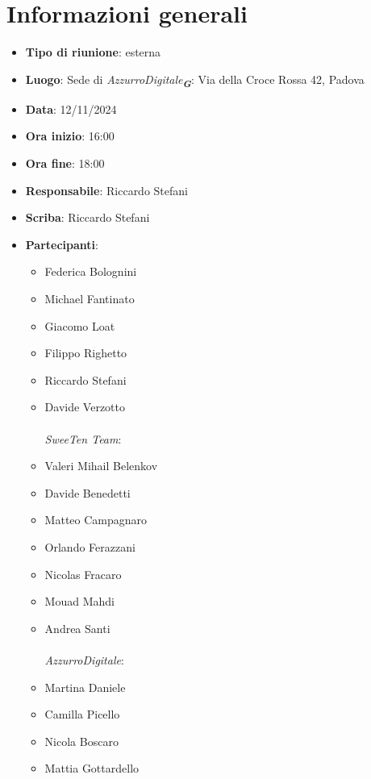 


\section{Informazioni generali}

\begin{itemize}
    \item \textbf{Tipo di riunione}: esterna
    \item \textbf{Luogo}: Sede di \emph{AzzurroDigitale}\textsubscript{\textit{\textbf{G}}}: Via della Croce Rossa 42, Padova
    \item \textbf{Data}: 12/11/2024
    \item \textbf{Ora inizio}: 16:00
    \item \textbf{Ora fine}: 18:00
    \item \textbf{Responsabile}: Riccardo Stefani
    \item \textbf{Scriba}: Riccardo Stefani
    \item \textbf{Partecipanti}:
    \begin{itemize}
        \item Federica Bolognini
        \item Michael Fantinato
        \item Giacomo Loat
        \item Filippo Righetto
        \item Riccardo Stefani
        \item Davide Verzotto \\ \\
        \emph{SweeTen Team}:
        \item Valeri Mihail Belenkov
        \item Davide Benedetti
        \item Matteo Campagnaro
        \item Orlando Ferazzani
        \item Nicolas Fracaro
        \item Mouad Mahdi
        \item Andrea Santi \\ \\
        \emph{AzzurroDigitale}:
        \item Martina Daniele
        \item Camilla Picello
        \item Nicola Boscaro
        \item Mattia Gottardello
    \end{itemize}
\end{itemize}
